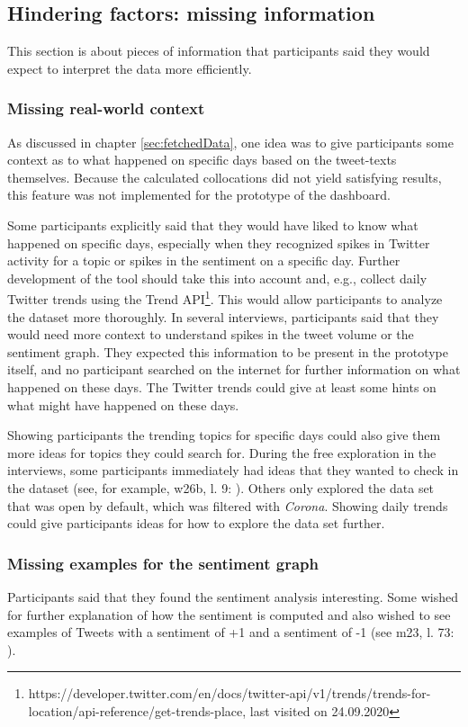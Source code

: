 \subsection{Hindering factors: missing information}
This section is about pieces of information that participants said they would expect to interpret the data more efficiently. 

\subsubsection*{Missing real-world context}
As discussed in chapter \ref{sec:fetchedData}, one idea was to give participants some context as to what happened on specific days based on the tweet-texts themselves. Because the calculated collocations did not yield satisfying results, this feature was not implemented for the prototype of the dashboard.

Some participants explicitly said that they would have liked to know what happened on specific days, especially when they recognized spikes in Twitter activity for a topic or spikes in the sentiment on a specific day. Further development of the tool should take this into account and, e.g., collect daily Twitter trends using the Trend API\footnote{https://developer.twitter.com/en/docs/twitter-api/v1/trends/trends-for-location/api-reference/get-trends-place, last visited on 24.09.2020}. This would allow participants to analyze the dataset more thoroughly. In several interviews, participants said that they would need more context to understand spikes in the tweet volume or the sentiment graph. They expected this information to be present in the prototype itself, and no participant searched on the internet for further information on what happened on these days. The Twitter trends could give at least some hints on what might have happened on these days.

Showing participants the trending topics for specific days could also give them more ideas for topics they could search for. During the free exploration in the interviews, some participants immediately had ideas that they wanted to check in the dataset (see, for example, w26b, l. 9: ). Others only explored the data set that was open by default, which was filtered with \emph{Corona}. Showing daily trends could give participants ideas for how to explore the data set further.

\subsubsection*{Missing examples for the sentiment graph}\label{sec:missingExamples}
Participants said that they found the sentiment analysis interesting. Some wished for further explanation of how the sentiment is computed and also wished to see examples of Tweets with a sentiment of +1 and a sentiment of -1 (see m23, l. 73: ).

